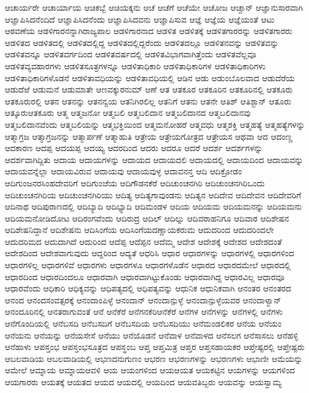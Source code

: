 {ಆಚಾರ್ಯರೇ
ಆಚಾರ್ಯಾಯ
ಆಚಿಕಬ್ಬೆ
ಆಚಿಯಕ್ಕನು
ಆಚೆ
ಆಚೆಗೆ
ಆಚೆಯೇ
ಆಚೋಜ
ಆಚ್ಚಾನ್
ಆಜ್ಞಾನುಸಾರವಾಗಿ
ಆಜ್ಞಾಪಿಸಿದನೆಂದಿದೆ
ಆಜ್ಞಾಪಿಸಿದನೆಂದು
ಆಜ್ಞಾಪಿಸಿದವನು
ಆಜ್ಞಾಪಿಸುವ
ಆಜ್ಞೆ
ಆಜ್ಞೆಯ
ಆಜ್ಞೆಯಂತೆ
ಆಟು
ಆಠವಣೆಯ
ಆಡಳಿಗಾರನನ್ನಾಗಿರಾಜ್ಯಪಾಲ
ಆಡಳಿಗಾರನಾದ
ಆಡಳಿತ
ಆಡಳಿತಕ್ಕೆ
ಆಡಳಿತಗಾರರನ್ನು
ಆಡಳಿತಗಾರರು
ಆಡಳಿತದ
ಆಡಳಿತದಲ್ಲಿ
ಆಡಳಿತದಲ್ಲಿದ್ದ
ಆಡಳಿತದಲ್ಲಿದ್ದರೆಂದು
ಆಡಳಿತದಲ್ಲೂ
ಆಡಳಿತನವನ್ನು
ಆಡಳಿತವನ್ನು
ಆಡಳಿತವನ್ನೂ
ಆಡಳಿತವರ್ಗದಿಂದ
ಆಡಳಿತವರ್ಷದಲ್ಲಿ
ಆಡಳಿತವಿಭಾಗವಾಗಿತ್ತೆಂದು
ಆಡಳಿತವೆಲ್ಲವೂ
ಆಡಳಿತವ್ಯವಹಾರಗಳು
ಆಡಳಿತಸೂತ್ರಗಳನ್ನೂ
ಆಡಳಿತಾಧಿಕಾರಿ
ಆಡಳಿತಾಧಿಕಾರಿಗಳ
ಆಡಳಿತಾಧಿಕಾರಿಗಳು
ಆಡಳಿತಾಧಿಕಾರಿಗಳೊಡನೆ
ಆಡಳಿತಾವಧಿಯನ್ನು
ಆಡಳಿತಾವಧಿಯಲ್ಲಿ
ಆಡಿನ
ಆಡು
ಆಡುಂಬೊಲವಾದ
ಆಡುದೆರೆಯ
ಆಡುದೆಱೆ
ಆಡುಮನೆ
ಆಡುಮಾತೇ
ಆಣವಕ್ಕುರನುಮ್
ಆಣೆ
ಆತ
ಆತಕೂರ
ಆತಕೂರಿನ
ಆತಕೂರಿನಲ್ಲಿ
ಆತಕೂರು
ಆತಕೂರುರಲ್ಲಿ
ಆತನ
ಆತನನ್ನು
ಆತನನ್ವಯ
ಆತನಿಗಿರಲಿಲ್ಲ
ಆತನಿಗೆ
ಆತನು
ಆತನೇ
ಆತಿಶ್
ಆತಿಶ್ಖಾನ್
ಆತೂರು
ಆತ್ಕೂರುಆತಕೂರು
ಆತ್ಮ
ಆತ್ಮಜನೋ
ಆತ್ಮಬಲಿ
ಆತ್ಮಬಲಿದಾನ
ಆತ್ಮಬಲಿದಾನದ
ಆತ್ಮಬಲಿದಾನವು
ಆತ್ಮಬಲಿದಾನವೆಂದು
ಆತ್ಮಬಲಿಯನ್ನು
ಆತ್ಮಭಕ್ತಿಯಿಂದ
ಆತ್ಮಮನೋಹರೆ
ಆತ್ಮವಧು
ಆತ್ಮಶಕ್ತಿ
ಆತ್ಮಹತ್ಯೆ
ಆತ್ಮಹತ್ಯೆಗಳನ್ನು
ಆತ್ಮಾಗ್ರಜ
ಆತ್ಮಾಗ್ರಜನನ್ನು
ಆತ್ಮಾರ್ಪಣೆ
ಆತ್ಮಾಹುತಿ
ಆತ್ರೇಯ
ಆತ್ರೇಯಗೋತ್ರದ
ಆತ್ರೇಯಸ
ಆಥವಾ
ಆದ
ಆದಂಣ್ಣ
ಆದಕಾರಣ
ಆದಪ್ಪ
ಆದಯಪ್ಪ
ಆದಯ್ಯ
ಆದರದಿಂದ
ಆದರು
ಆದರೂ
ಆದರೆ
ಆದರ್ಶ
ಆದರ್ಶಗಳನ್ನು
ಆದರ್ಶವಾಗಿದ್ದಿತು
ಆದಾಯ
ಆದಾಯಗಳನ್ನು
ಆದಾಯದ
ಆದಾಯದಲಿ
ಆದಾಯದಲ್ಲಿ
ಆದಾಯದಿಂದ
ಆದಾಯವನ್ನು
ಆದಾಯವನ್ನೆಲ್ಲಾ
ಆದಾಯವಿರುವ
ಆದಾಯವು
ಆದಾಯವುಳ್ಳ
ಆದಾವನನ್ತ
ಆದಿ
ಆದಿಕ್ರೋಡಂ
ಆದಿಗುಂಜನರಸಿಂಹದೇವರಿಗೆ
ಆದಿಗುಂಜೆಯ
ಆದಿಗೌಡನಕೆರೆ
ಆದಿಚುಂಚನಗಿರಿ
ಆದಿಚುಂಚನಗಿರಿಒಂದು
ಆದಿಚುಂಚನಗಿರಿಯ
ಆದಿಚುಂಚನಗಿರಿಯು
ಆದಿತ್ಯ
ಆದಿತ್ಯಗಾವುಂಡನು
ಆದಿತ್ಯನ
ಆದಿದೇವ
ಆದಿದೇವನ
ಆದಿದೇವರಿಗೆ
ಆದಿನಾಥ
ಆದಿಪುರಾಣದಲ್ಲಿ
ಆದಿಬ್ಯಾದಿ
ಆದಿಭ್ಯಾದಿ
ಆದಿಮಂಡಳ
ಆದಿಯ
ಆದಿಯಮ
ಆದಿಯಮನನ್ನು
ಆದಿಯಮನು
ಆದಿಯಮನೋಡಿದೋಟ
ಆದಿರಂಗವೆಂದು
ಆದಿರುದ್ರ
ಆದಿಲ್
ಆದಿಲ್ನು
ಆದಿವರಾಹನಿಗೂ
ಆದಿವಾರ
ಆದಿಶೇಷನ
ಆದಿಶೇಷನಿದ್ದಾನೆ
ಆದಿಶೇಷನು
ಆದಿಸಿಂಗೆಯ
ಆದಿಸಿಂಗೆಯದಣ್ಣಾಯಕರುಮ
ಆದುದರಿಂದ
ಆದುದರಿಂದಲೇ
ಆದುದರಿಮದ
ಆದುದಾಗಿದೆ
ಆದುರಿಂದ
ಆದೆಪ್ಪ
ಆದೆಪ್ಪನ
ಆದೆಮ್ಮ
ಆದೇಶ
ಆದೇಶಕ್ಕೆ
ಆದೇಶದ
ಆದೇಶದಂತೆ
ಆದೇಶದಿಂದ
ಆದೇಶವಾಗುವುದು
ಆದ್ದರಿಂದ
ಆದ್ಯತೆ
ಆಧರಿಸಿ
ಆಧಾರ
ಆಧಾರಗಳನ್ನು
ಆಧಾರಗಳಲ್ಲಿ
ಆಧಾರಗಳಿಂದ
ಆಧಾರಗಳಿಲ್ಲ
ಆಧಾರಗಳಿವೆ
ಆಧಾರಗಳು
ಆಧಾರಗಳೂ
ಆಧಾರಗಳೊಡೆನ
ಆಧಾರದ
ಆಧಾರದಮೇಲೆ
ಆಧಾರದಲ್ಲಿ
ಆಧಾರದಿಂದ
ಆಧಾರದಿಂದಲೂ
ಆಧಾರವಾಗಿ
ಆಧಾರವಾಗಿಟ್ಟುಕೊಂಡು
ಆಧಾರವಾಗಿದ್ದ
ಆಧಾರವಿಲ್ಲ
ಆಧಾರವೂ
ಆಧಾರವೆಂದು
ಆಧಿಕಾರಿ
ಆಧಿಕ್ಯವನ್ನು
ಆಧಿಪತ್ಯದಲ್ಲಿ
ಆಧಿಪತ್ಯವನ್ನು
ಆಧುನಿಕ
ಆಧುನಿಕವಾಗಿ
ಆನಂತರ
ಆನಂತರದ
ಆನಂದ
ಆನಂದಸಂವತ್ಸರಕ್ಕೆ
ಆನಂದಾಂಪಿಳ್ಳೆ
ಆನಂದಾನ್
ಆನಂದಾನ್ಪುಳ್ಳೆ
ಆನಂದಾನ್ಪುಳ್ಳೆಯವರ
ಆನಂದಾಳ್ವಾನ್
ಆನಂದೂರಿನಲ್ಲಿ
ಆನತರಾಗುವಂತೆ
ಆನೆ
ಆನೆಕೆರೆ
ಆನೆಗನಕೆರಿಆನೆಕೆರೆ
ಆನೆಗಳ
ಆನೆಗಳನ್ನು
ಆನೆಗಳಲ್ಲಿ
ಆನೆಗಳು
ಆನೆಗೊಂದಿಯಲ್ಲಿ
ಆನೆಬಸದಿ
ಆನೆಬಸದಿಗೆ
ಆನೆಬಸದಿಯ
ಆನೆಬಸದಿಯು
ಆನೆಮಂಡಲಿಕರ
ಆನೆಯ
ಆನೆಯಂ
ಆನೆಯನು
ಆನೆಯನ್ನು
ಆನೆಯಸೇಸೆ
ಆನೆಯು
ಆನೆಯೊಡನೆ
ಆನೆವಾಳ
ಆನೆವಾಳದ
ಆನೆಸಲಗ
ಆನೆಸಾಸಲು
ಆನೆಹಳ್ಳಿ
ಆನೆಹಾಳು
ಆಪಸ್ತಂಭ
ಆಪಸ್ತಂಭಸೂತ್ರದ
ಆಪಸ್ಥಂಬ
ಆಪ್ತ
ಆಪ್ತಮಿತ್ರ
ಆಪ್ತರ
ಆಪ್ತಸಹಾಯಕರ
ಆಪ್ತೇಷ್ಟರಲ್ಲಿ
ಆಪ್ತೇಷ್ಟರು
ಆಬಲವಾಡಿಯ
ಆಬಲವಾಡಿಯಲ್ಲಿ
ಆಭಣದನುಗುಣಂ
ಆಭರಣ
ಆಭರಣಗಳನ್ನು
ಆಭರಣಗಳು
ಆಭಾಣೀ
ಆಮೆಯನ್ನು
ಆಮೇಲೆ
ಆಮ್ನಾಯ
ಆಮ್ನಾಯಆವಳಿ
ಆಯ
ಆಯಂಗಳಿಂದ
ಆಯಆಯತ
ಆಯಕಟ್ಟಿನ
ಆಯಗಳನ್ನು
ಆಯಗಳಿಂದ
ಆಯಗಾರರು
ಆಯತಕ್ಕೆ
ಆಯತದ
ಆಯದ
ಆಯದಲ್ಲಿ
ಆಯದಿಂದ
ಆಯವತಿಬ್ಬರು
ಆಯವನ್ನು
ಆಯಸ್ವಾಮ್ಯ
}
